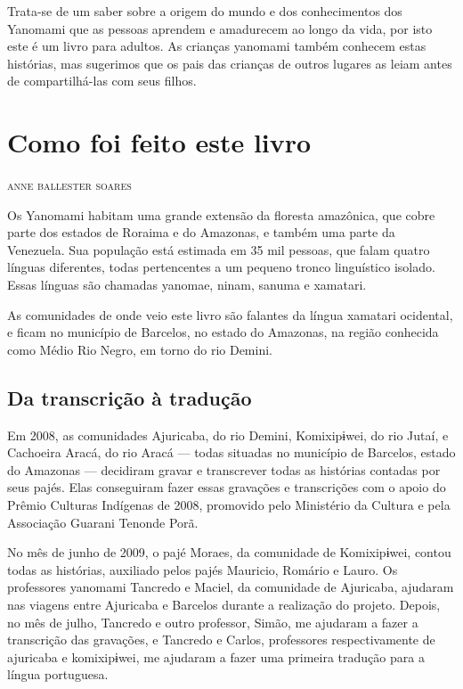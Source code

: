 Trata-se de um saber sobre a origem do mundo e dos conhecimentos dos Yanomami que as pessoas aprendem e amadurecem ao longo da vida, por isto este é um livro para adultos. As crianças yanomami também conhecem estas histórias, mas sugerimos que os pais das crianças de outros lugares as leiam antes de compartilhá-las com seus filhos.

\chapter{Como foi feito este livro}

\begin{flushright}
\textsc{anne ballester soares}
\end{flushright}

\noindent{}Os Yanomami habitam uma grande extensão da floresta amazônica, que cobre
parte dos estados de Roraima e do Amazonas, e também uma parte da
Venezuela. Sua população está estimada em 35 mil pessoas, que falam
quatro línguas diferentes, todas pertencentes a um pequeno tronco
linguístico isolado. Essas línguas são chamadas yanomae, ninam, sanuma e
xamatari.

As comunidades de onde veio este livro são falantes da língua xamatari
ocidental, e ficam no município de Barcelos, no estado do Amazonas, na
região conhecida como Médio Rio Negro, em torno do rio Demini. 

\section{Da transcrição à tradução}

Em 2008, as comunidades Ajuricaba, do rio Demini, Komixipɨwei, do rio
Jutaí, e Cachoeira Aracá, do rio Aracá --- todas situadas no município
de Barcelos, estado do Amazonas --- decidiram gravar e transcrever todas
as histórias contadas por seus pajés. Elas conseguiram fazer essas
gravações e transcrições com o apoio do Prêmio Culturas Indígenas de
2008, promovido pelo Ministério da Cultura e pela Associação Guarani
Tenonde Porã.

No mês de junho de 2009, o pajé Moraes, da comunidade de Komixipɨwei,
contou todas as histórias, auxiliado pelos pajés Mauricio, Romário e
Lauro. Os professores yanomami Tancredo e Maciel, da comunidade de
Ajuricaba, ajudaram nas viagens entre Ajuricaba e Barcelos durante a
realização do projeto. Depois, no mês de julho, Tancredo e outro
professor, Simão, me ajudaram a fazer a transcrição das gravações, e
Tancredo e Carlos, professores respectivamente de ajuricaba e
komixipɨwei, me ajudaram a fazer uma primeira tradução para a língua
portuguesa.  

